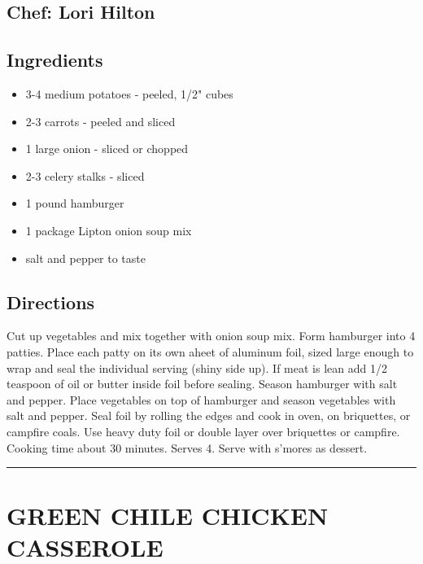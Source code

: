 \documentclass[
]{book}
\providecommand{\tightlist}{%
  \setlength{\itemsep}{0pt}\setlength{\parskip}{0pt}}
\begin{document}
\hypertarget{chef-lori-hilton-4}{%
\subsection*{Chef: Lori Hilton}\label{chef-lori-hilton-4}}


\hypertarget{ingredients-56}{%
\subsection*{Ingredients}\label{ingredients-56}}


\begin{itemize}
\tightlist
\item
  3-4 medium potatoes - peeled, 1/2" cubes
\item
  2-3 carrots - peeled and sliced
\item
  1 large onion - sliced or chopped
\item
  2-3 celery stalks - sliced
\item
  1 pound hamburger
\item
  1 package Lipton onion soup mix
\item
  salt and pepper to taste
\end{itemize}

\hypertarget{directions-56}{%
\subsection*{Directions}\label{directions-56}}


Cut up vegetables and mix together with onion soup mix. Form hamburger into 4 patties.
Place each patty on its own aheet of aluminum foil, sized large enough to wrap and seal the individual
serving (shiny side up). If meat is lean add 1/2 teaspoon of oil or butter inside
foil before sealing. Season hamburger with salt and pepper. Place vegetables on top of hamburger
and season vegetables with salt and pepper. Seal foil by rolling the edges and cook in oven,
on briquettes, or campfire coals. Use heavy duty foil or double layer over briquettes or campfire.
Cooking time about 30 minutes. Serves 4. Serve with s'mores as dessert.

\begin{center}\rule{0.5\linewidth}{0.5pt}\end{center}

\hypertarget{green-chile-chicken-casserole}{%
\section*{GREEN CHILE CHICKEN CASSEROLE}\label{green-chile-chicken-casserole}}
\end{document}
